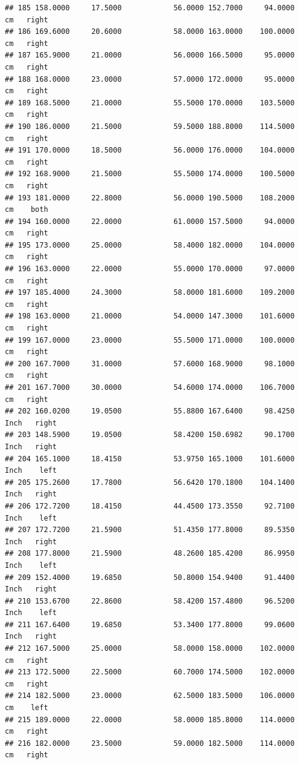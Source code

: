 \documentclass[]{article}
\begin{document}
\begin{verbatim}
## 185 158.0000     17.5000            56.0000 152.7000     94.0000     cm   right
## 186 169.6000     20.6000            58.0000 163.0000    100.0000     cm   right
## 187 165.9000     21.0000            56.0000 166.5000     95.0000     cm   right
## 188 168.0000     23.0000            57.0000 172.0000     95.0000     cm   right
## 189 168.5000     21.0000            55.5000 170.0000    103.5000     cm   right
## 190 186.0000     21.5000            59.5000 188.8000    114.5000     cm   right
## 191 170.0000     18.5000            56.0000 176.0000    104.0000     cm   right
## 192 168.9000     21.5000            55.5000 174.0000    100.5000     cm   right
## 193 181.0000     22.8000            56.0000 190.5000    108.2000     cm    both
## 194 160.0000     22.0000            61.0000 157.5000     94.0000     cm   right
## 195 173.0000     25.0000            58.4000 182.0000    104.0000     cm   right
## 196 163.0000     22.0000            55.0000 170.0000     97.0000     cm   right
## 197 185.4000     24.3000            58.0000 181.6000    109.2000     cm   right
## 198 163.0000     21.0000            54.0000 147.3000    101.6000     cm   right
## 199 167.0000     23.0000            55.5000 171.0000    100.0000     cm   right
## 200 167.7000     31.0000            57.6000 168.9000     98.1000     cm   right
## 201 167.7000     30.0000            54.6000 174.0000    106.7000     cm   right
## 202 160.0200     19.0500            55.8800 167.6400     98.4250   Inch   right
## 203 148.5900     19.0500            58.4200 150.6982     90.1700   Inch   right
## 204 165.1000     18.4150            53.9750 165.1000    101.6000   Inch    left
## 205 175.2600     17.7800            56.6420 170.1800    104.1400   Inch   right
## 206 172.7200     18.4150            44.4500 173.3550     92.7100   Inch    left
## 207 172.7200     21.5900            51.4350 177.8000     89.5350   Inch   right
## 208 177.8000     21.5900            48.2600 185.4200     86.9950   Inch    left
## 209 152.4000     19.6850            50.8000 154.9400     91.4400   Inch   right
## 210 153.6700     22.8600            58.4200 157.4800     96.5200   Inch    left
## 211 167.6400     19.6850            53.3400 177.8000     99.0600   Inch   right
## 212 167.5000     25.0000            58.0000 158.0000    102.0000     cm   right
## 213 172.5000     22.5000            60.7000 174.5000    102.0000     cm   right
## 214 182.5000     23.0000            62.5000 183.5000    106.0000     cm    left
## 215 189.0000     22.0000            58.0000 185.8000    114.0000     cm   right
## 216 182.0000     23.5000            59.0000 182.5000    114.0000     cm   right

\end{verbatim}
\end{document}
